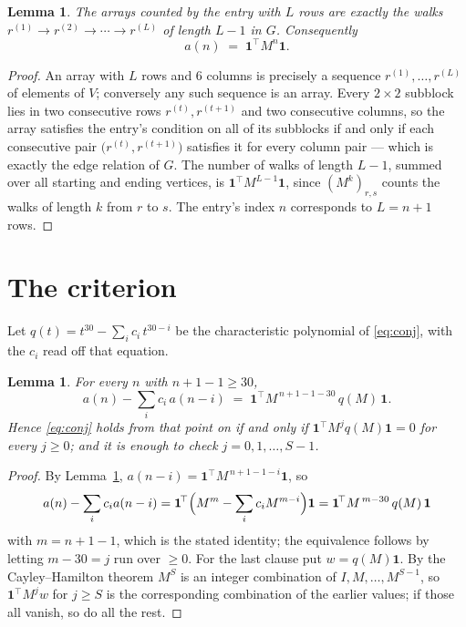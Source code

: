 \documentclass[11pt,a4paper]{article}
\theoremstyle{plain}
\newtheorem{lemma}[theorem]{Lemma}
\theoremstyle{definition}
\begin{document}
\begin{lemma}\label{lem:walk}
The arrays counted by the entry with $L$ rows are exactly the walks
$r^{(1)}\to r^{(2)}\to\cdots\to r^{(L)}$ of length $L-1$ in $G$. Consequently
\[
a(n)\;=\;\mathbf{1}^{\!\top}M^{n}\mathbf{1} .
\]
\end{lemma}

\begin{proof}
An array with $L$ rows and $6$ columns is precisely a sequence
$r^{(1)},\dots,r^{(L)}$ of elements of $V$; conversely any such sequence is an array.
Every $2\times2$ subblock lies in two consecutive rows $r^{(t)},r^{(t+1)}$ and two
consecutive columns, so the array satisfies the entry's condition on all of its subblocks
if and only if each consecutive pair $\bigl(r^{(t)},r^{(t+1)}\bigr)$ satisfies it for
every column pair --- which is exactly the edge relation of $G$. The number of walks of
length $L-1$, summed over all starting and ending vertices, is
$\mathbf{1}^{\!\top}M^{L-1}\mathbf{1}$, since $(M^{k})_{r,s}$ counts the walks of
length $k$ from $r$ to $s$. The entry's index $n$ corresponds to $L=n+1$ rows.
\end{proof}

\section{The criterion}

Let $q(t)=t^{30}-\sum_i c_i\,t^{30-i}$ be the characteristic polynomial of
\eqref{eq:conj}, with the $c_i$ read off that equation.

\begin{lemma}\label{lem:crit}
For every $n$ with $n+1-1\ge30$,
\[
a(n)-\sum_i c_i\,a(n-i)\;=\;\mathbf{1}^{\!\top}M^{\,n+1-1-30}\,q(M)\,\mathbf{1} .
\]
Hence \eqref{eq:conj} holds from that point on if and only if
$\mathbf{1}^{\!\top}M^{j}q(M)\mathbf{1}=0$ for every $j\ge0$; and it is enough to check
$j=0,1,\dots,S-1$.
\end{lemma}

\begin{proof}
By Lemma~\ref{lem:walk}, $a(n-i)=\mathbf{1}^{\!\top}M^{\,n+1-1-i}\mathbf{1}$, so
\[
a(n)-\sum_i c_i a(n-i)
=\mathbf{1}^{\!\top}\Bigl(M^{m}-\sum_i c_i M^{m-i}\Bigr)\mathbf{1}
=\mathbf{1}^{\!\top}M^{\,m-30}\,q(M)\,\mathbf{1}
\]
with $m=n+1-1$, which is the stated identity; the equivalence follows by letting
$m-30=j$ run over $\ge0$. For the last clause put $w=q(M)\mathbf{1}$. By the
Cayley--Hamilton theorem $M^{S}$ is an integer combination of $I,M,\dots,M^{S-1}$, so
$\mathbf{1}^{\!\top}M^{j}w$ for $j\ge S$ is the corresponding combination of the earlier
values; if those all vanish, so do all the rest.
\end{proof}
\end{document}
